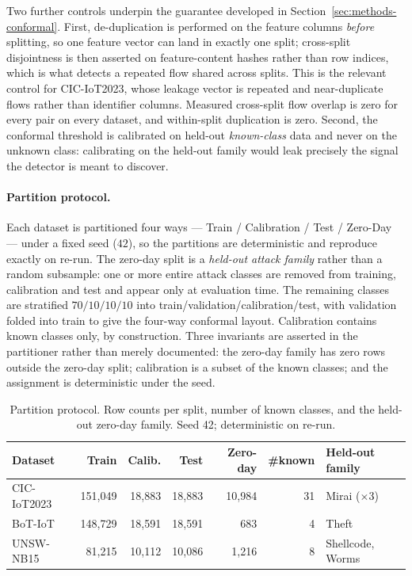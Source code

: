 Two further controls underpin the guarantee developed in Section~\ref{sec:methods-conformal}. First,
de-duplication is performed on the feature columns \emph{before} splitting, so one feature vector can land
in exactly one split; cross-split disjointness is then asserted on feature-content hashes rather than row
indices, which is what detects a repeated flow shared across splits. This is the relevant control for
CIC-IoT2023, whose leakage vector is repeated and near-duplicate flows rather than identifier columns.
Measured cross-split flow overlap is zero for every pair on every dataset, and within-split duplication is
zero. Second, the conformal threshold is calibrated on held-out \emph{known-class} data and never on the
unknown class: calibrating on the held-out family would leak precisely the signal the detector is meant to
discover.

\paragraph{Partition protocol.}
Each dataset is partitioned four ways --- Train / Calibration / Test / Zero-Day --- under a fixed seed
($42$), so the partitions are deterministic and reproduce exactly on re-run. The zero-day split is a
\emph{held-out attack family} rather than a random subsample: one or more entire attack classes are removed
from training, calibration and test and appear only at evaluation time. The remaining classes are stratified
$70/10/10/10$ into train/validation/calibration/test, with validation folded into train to give the
four-way conformal layout. Calibration contains known classes only, by construction. Three invariants are
asserted in the partitioner rather than merely documented: the zero-day family has zero rows outside the
zero-day split; calibration is a subset of the known classes; and the assignment is deterministic under the
seed.

\begin{table}[t]
\centering
\caption{Partition protocol. Row counts per split, number of known classes, and the held-out zero-day
family. Seed 42; deterministic on re-run.}
\label{tab:partitions}
\begin{tabular}{lrrrrrl}
\toprule
Dataset & Train & Calib. & Test & Zero-day & \#known & Held-out family \\
\midrule
CIC-IoT2023 & 151,049 & 18,883 & 18,883 & 10,984 & 31 & Mirai ($\times 3$) \\
BoT-IoT     & 148,729 & 18,591 & 18,591 &    683 &  4 & Theft \\
UNSW-NB15   &  81,215 & 10,112 & 10,086 &  1,216 &  8 & Shellcode, Worms \\
\bottomrule
\end{tabular}
\end{table}

